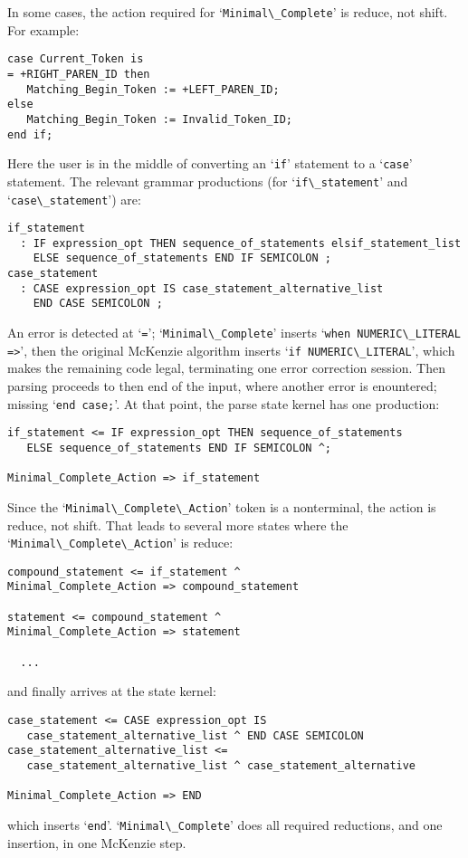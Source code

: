 \documentclass{article}
\newcommand{\code}[1]{`\lstinline|#1|'}
\begin{document}
In some cases, the action required for \code{Minimal\_Complete} is
reduce, not shift. For example:
\begin{lstlisting}
case Current_Token is
= +RIGHT_PAREN_ID then
   Matching_Begin_Token := +LEFT_PAREN_ID;
else
   Matching_Begin_Token := Invalid_Token_ID;
end if;
\end{lstlisting}
Here the user is in the middle of converting an \code{if} statement to
a \code{case} statement. The relevant grammar productions (for
\code{if\_statement} and \code{case\_statement}) are:
\begin{verbatim}
if_statement
  : IF expression_opt THEN sequence_of_statements elsif_statement_list
    ELSE sequence_of_statements END IF SEMICOLON ;
case_statement
  : CASE expression_opt IS case_statement_alternative_list
    END CASE SEMICOLON ;
\end{verbatim}
An error is detected at \code{=}; \code{Minimal\_Complete} inserts
\code{when NUMERIC\_LITERAL =>}, then the original McKenzie algorithm
inserts \code{if NUMERIC\_LITERAL}, which makes the remaining code
legal, terminating one error correction session. Then parsing proceeds
to then end of the input, where another error is enountered; missing
\code{end case;}. At that point, the parse state kernel has one
production:
\begin{verbatim}
if_statement <= IF expression_opt THEN sequence_of_statements
   ELSE sequence_of_statements END IF SEMICOLON ^;

Minimal_Complete_Action => if_statement
\end{verbatim}
Since the \code{Minimal\_Complete\_Action} token is a nonterminal, the action
is reduce, not shift. That leads to several more states where the
\code{Minimal\_Complete\_Action} is reduce:
\begin{verbatim}
compound_statement <= if_statement ^
Minimal_Complete_Action => compound_statement

statement <= compound_statement ^
Minimal_Complete_Action => statement

  ...
\end{verbatim}

and finally arrives at the
state kernel:
\begin{verbatim}
case_statement <= CASE expression_opt IS
   case_statement_alternative_list ^ END CASE SEMICOLON
case_statement_alternative_list <=
   case_statement_alternative_list ^ case_statement_alternative

Minimal_Complete_Action => END
\end{verbatim}
which inserts \code{end}. \code{Minimal\_Complete} does all required
reductions, and one insertion, in one McKenzie step.
\end{document}
